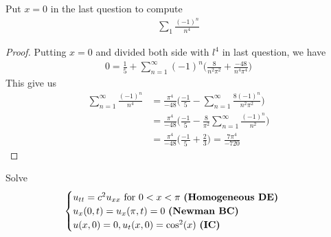 \documentclass{report}
\begin{document}
\begin{question}{}{}
Put $x=0$ in the last question to compute 
 \begin{align*}
\sum_1 \frac{(-1)^n}{n^4}
\end{align*}
\end{question}
\begin{proof}
Putting $x=0$ and divided both side with  $l^4$ in last question, we have 
\begin{align*}
0= \frac{1}{5}+ \sum_{n=1}^{\infty} (-1)^n \Big(\frac{8}{n^2 \pi ^2} + \frac{-48}{n^4 \pi ^4}\Big)
\end{align*}
This give us 
\begin{align*}
\sum_{n=1}^{\infty} \frac{(-1)^n}{n^4}&= \frac{\pi  ^4}{-48} \Big( \frac{-1}{5}-\sum_{n=1}^{\infty} \frac{8(-1)^n}{n^2 \pi ^2} \Big) \\
&=\frac{\pi ^4}{-48}\Big( \frac{-1}{5}- \frac{8}{\pi ^2} \sum_{n=1}^{\infty} \frac{(-1)^n}{n^2} \Big) \\
&=\frac{\pi ^4}{-48}\Big( \frac{-1}{5}+ \frac{2}{3} \Big)= \frac{7 \pi ^4}{-720}
\end{align*}
\end{proof}
\begin{question}{}{}
Solve 
\begin{align*}
\begin{cases}
  u_{tt}=c^2u_{xx}\text{ for }0<x<\pi \text{ \textbf{(Homogeneous DE)} }  \\
  u_x(0,t)= u_x(\pi ,t)=0\text{ \textbf{(Newman BC)} } \\
  u(x,0)=0,u_t(x,0)=\cos ^2(x)\text{ \textbf{(IC)} }
\end{cases}
\end{align*}
\end{question}
\end{document}
